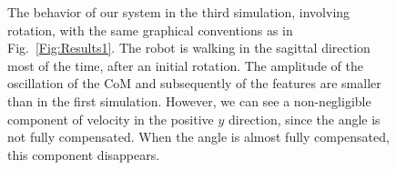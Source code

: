 \begin{figure}[ht]
{ \label{Fig:Results3c}
 }
 \caption[]{\label{Fig:Results3}\small{The behavior of our system in the third simulation, involving rotation, with the same graphical conventions as in Fig.~\ref{Fig:Results1}. The robot is walking in the sagittal direction most of the time, after an initial rotation. The amplitude of the oscillation of the CoM and subsequently of the features are smaller than in the first simulation. However, we can see a non-negligible component of velocity in the positive $y$ direction, since the angle is not fully compensated. When the angle is almost fully compensated, this component disappears.}}
 \end{figure}

\begin{figure}[ht]
 \centering
\end{figure}
